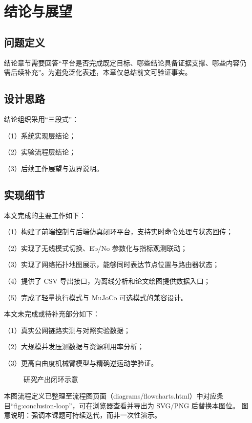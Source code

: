 
\section{结论与展望}

\subsection{问题定义}
结论章节需要回答“平台是否完成既定目标、哪些结论具备证据支撑、哪些内容仍需后续补充”。为避免泛化表述，本章仅总结前文可验证事实。

\subsection{设计思路}
结论组织采用“三段式”：

（1）系统实现层结论；

（2）实验流程层结论；

（3）后续工作展望与边界说明。

\subsection{实现细节}
本文完成的主要工作如下：

（1）构建了前端控制与后端仿真闭环平台，支持实时命令处理与状态回传；

（2）实现了无线模式切换、Eb/No 参数化与指标观测联动；

（3）实现了网络拓扑地图展示，能够同时表达节点位置与路由器状态；

（4）提供了 CSV 导出接口，为离线分析和论文绘图提供数据入口；

（5）完成了轻量执行模式与 MuJoCo 可选模式的兼容设计。

本文未完成或待补充部分如下：

（1）真实公网链路实测与对照实验数据；

（2）大规模并发压测数据与资源利用率分析；

（3）更高自由度机械臂模型与精确逆运动学验证。

\begin{figure}[htbp]
\centering
{}
\caption{研究产出闭环示意}
\label{fig:conclusion-loop}
\end{figure}

\noindent 本图流程定义已整理至流程图页面（diagrams/flowcharts.html）中对应条目“fig:conclusion-loop”，可在浏览器查看并导出为 SVG/PNG 后替换本图位。
\noindent 图意说明：强调本课题可持续迭代，而非一次性演示。

